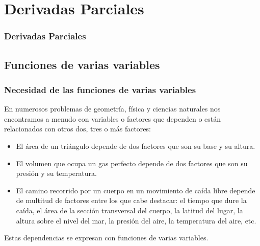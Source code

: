 

\section{Derivadas Parciales}
\begin{frame}
\frametitle{Derivadas Parciales}
\tableofcontents[sectionstyle=show/hide,hideothersubsections]
\end{frame}



\subsection{Funciones de varias variables}
\begin{frame}
\frametitle{Necesidad de las funciones de varias variables}
En numerosos problemas de geometría, física y ciencias naturales nos encontramos a menudo con variables o factores que dependen o están relacionados con otros dos, tres o más factores:
\begin{itemize}
\item El área de un triángulo depende de dos factores que son su base y su altura.
\item El volumen que ocupa un gas perfecto depende de dos factores que son su presión y su temperatura.
\item El camino recorrido por un cuerpo en un movimiento de caída libre depende de multitud de factores entre los que cabe destacar: el tiempo que dure la caída, el área de la sección transversal del cuerpo, la latitud del lugar, la altura sobre el nivel del mar, la presión del aire, la temperatura del aire, etc.
\end{itemize}
Estas dependencias se expresan con funciones de varias variables.
\end{frame}


